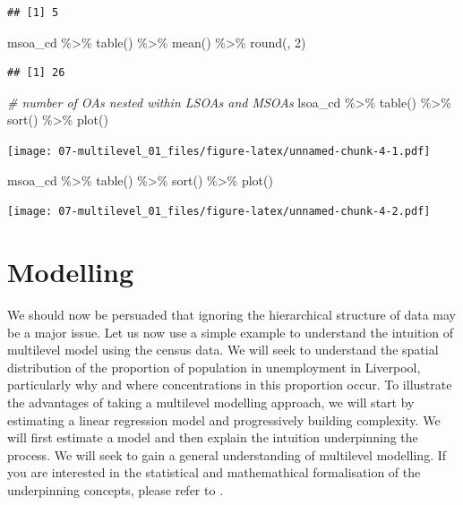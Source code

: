 \documentclass[
]{book}
\newenvironment{Shaded}{\begin{snugshade}}{\end{snugshade}}
\newcommand{\CommentTok}[1]{\textcolor[rgb]{0.56,0.35,0.01}{\textit{#1}}}
\newcommand{\DecValTok}[1]{\textcolor[rgb]{0.00,0.00,0.81}{#1}}
\newcommand{\FunctionTok}[1]{\textcolor[rgb]{0.00,0.00,0.00}{#1}}
\newcommand{\NormalTok}[1]{#1}
\newcommand{\SpecialCharTok}[1]{\textcolor[rgb]{0.00,0.00,0.00}{#1}}
\begin{document}
\begin{verbatim}
## [1] 5
\end{verbatim}

\begin{Shaded}
\begin{Highlighting}[]
\NormalTok{msoa\_cd }\SpecialCharTok{\%\textgreater{}\%} \FunctionTok{table}\NormalTok{() }\SpecialCharTok{\%\textgreater{}\%}
  \FunctionTok{mean}\NormalTok{() }\SpecialCharTok{\%\textgreater{}\%}
  \FunctionTok{round}\NormalTok{(, }\DecValTok{2}\NormalTok{)}
\end{Highlighting}
\end{Shaded}

\begin{verbatim}
## [1] 26
\end{verbatim}

\begin{Shaded}
\begin{Highlighting}[]
\CommentTok{\# number of OAs nested within LSOAs and MSOAs}
\NormalTok{lsoa\_cd }\SpecialCharTok{\%\textgreater{}\%} \FunctionTok{table}\NormalTok{() }\SpecialCharTok{\%\textgreater{}\%}
  \FunctionTok{sort}\NormalTok{() }\SpecialCharTok{\%\textgreater{}\%}
  \FunctionTok{plot}\NormalTok{()}
\end{Highlighting}
\end{Shaded}

\texttt{[image: 07-multilevel\_01\_files/figure-latex/unnamed-chunk-4-1.pdf]}

\begin{Shaded}
\begin{Highlighting}[]
\NormalTok{msoa\_cd }\SpecialCharTok{\%\textgreater{}\%} \FunctionTok{table}\NormalTok{() }\SpecialCharTok{\%\textgreater{}\%}
  \FunctionTok{sort}\NormalTok{() }\SpecialCharTok{\%\textgreater{}\%}
  \FunctionTok{plot}\NormalTok{()}
\end{Highlighting}
\end{Shaded}

\texttt{[image: 07-multilevel\_01\_files/figure-latex/unnamed-chunk-4-2.pdf]}

\hypertarget{modelling}{%
\section{Modelling}\label{modelling}}

We should now be persuaded that ignoring the hierarchical structure of data may be a major issue. Let us now use a simple example to understand the intuition of multilevel model using the census data. We will seek to understand the spatial distribution of the proportion of population in unemployment in Liverpool, particularly why and where concentrations in this proportion occur. To illustrate the advantages of taking a multilevel modelling approach, we will start by estimating a linear regression model and progressively building complexity. We will first estimate a model and then explain the intuition underpinning the process. We will seek to gain a general understanding of multilevel modelling. If you are interested in the statistical and mathemathical formalisation of the underpinning concepts, please refer to \citet{Gelman_Hill_2006_book}.
\end{document}
